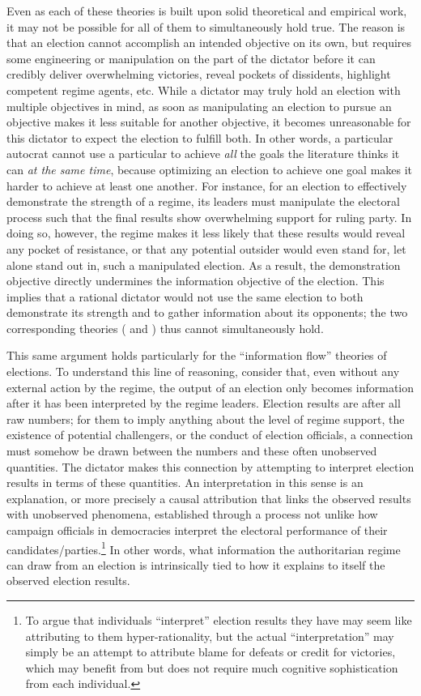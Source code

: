 \documentclass[12pt]{article}\usepackage[]{graphicx}\usepackage[]{color}
\newcommand{\1}{\mathbbm{1}}
\begin{document}
Even as each of these theories is built upon solid theoretical and empirical work, it may not be possible for all of them to simultaneously hold true. The reason is that an election cannot accomplish an intended objective on its own, but requires some engineering or manipulation on the part of the dictator before it can credibly deliver overwhelming victories, reveal pockets of dissidents, highlight competent regime agents, etc. While a dictator may truly hold an election with multiple objectives in mind, as soon as manipulating an election to pursue an objective makes it less suitable for another objective, it becomes unreasonable for this dictator to expect the election to fulfill both. In other words, a particular autocrat cannot use a particular to achieve \textit{all} the goals the literature thinks it can \textit{at the same time}, because optimizing an election to achieve one goal makes it harder to achieve at least one another. For instance, for an election to effectively demonstrate the strength of a regime, its leaders must manipulate the electoral process such that the final results show overwhelming support for ruling party. In doing so, however, the regime makes it less likely that these results would reveal any pocket of resistance, or that any potential outsider would even stand for, let alone stand out in, such a manipulated election. As a result, the demonstration objective directly undermines the information objective of the election. This implies that a rational dictator would not use the same election to both demonstrate its strength and to gather information about its opponents; the two corresponding theories (\cite{Geddes2005} and \cite{LustOkar2005}) thus cannot simultaneously hold.

This same argument holds particularly for the ``information flow'' theories of elections. To understand this line of reasoning, consider that, even without any external action by the regime, the output of an election only becomes information after it has been interpreted by the regime leaders. Election results are after all raw numbers; for them to imply anything about the level of regime support, the existence of potential challengers, or the conduct of election officials, a connection must somehow be drawn between the numbers and these often unobserved quantities. The dictator makes this connection by attempting to interpret election results in terms of these quantities. An interpretation in this sense is an explanation, or more precisely a causal attribution that links the observed results with unobserved phenomena, established through a process not unlike how campaign officials in democracies interpret the electoral performance of their candidates/parties.\footnote{To argue that individuals ``interpret'' election results they have may seem like attributing to them hyper-rationality, but the actual ``interpretation'' may simply be an attempt to attribute blame for defeats or credit for victories, which may benefit from but does not require much cognitive sophistication from each individual.} In other words, what information the authoritarian regime can draw from an election is intrinsically tied to how it explains to itself the observed election results.
\end{document}

